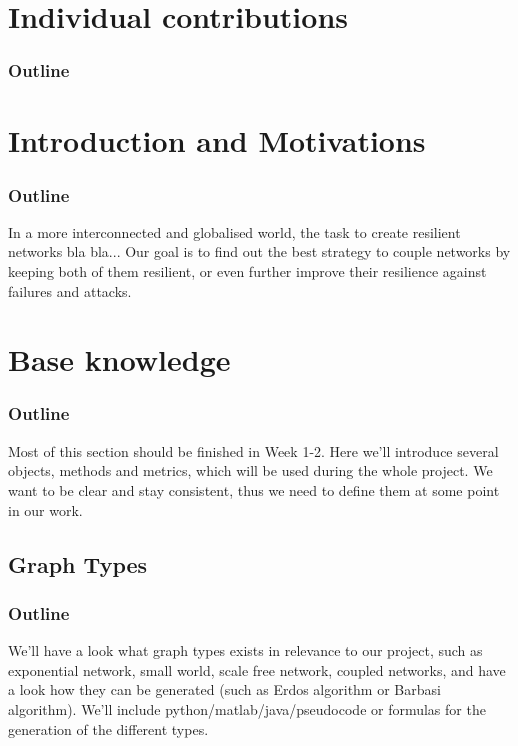 \documentclass[11pt]{article}
\begin{document}
\tableofcontents

\newpage





\section{Individual contributions}
\subsubsection{Outline}

\section{Introduction and Motivations}
\subsubsection{Outline}
In a more interconnected and globalised world, the task to create resilient networks bla bla... Our goal is to find out the best strategy to couple networks by keeping both of them resilient, or even further improve their resilience against failures and attacks.
\section{Base knowledge} 
\subsubsection{Outline}
Most of this section should be finished in Week 1-2. Here we'll introduce several objects, methods and metrics, which will be used during the whole project. We want to be clear and stay consistent, thus we need to define them at some point in our work.
\subsection{Graph Types}
\subsubsection{Outline}
We'll have a look what graph types exists in relevance to our project, such as exponential network, small world, scale free network, coupled networks, and have a look how they can be generated (such as Erdos algorithm or Barbasi algorithm). We'll include python/matlab/java/pseudocode or formulas for the generation of the different types.
\end{document}

